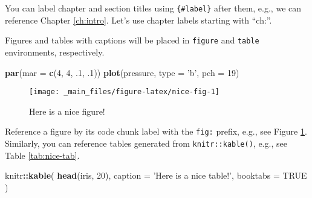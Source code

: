 \documentclass[]{book}
\newenvironment{Shaded}{\begin{snugshade}}{\end{snugshade}}
\newcommand{\DataTypeTok}[1]{\textcolor[rgb]{0.13,0.29,0.53}{#1}}
\newcommand{\DecValTok}[1]{\textcolor[rgb]{0.00,0.00,0.81}{#1}}
\newcommand{\FloatTok}[1]{\textcolor[rgb]{0.00,0.00,0.81}{#1}}
\newcommand{\KeywordTok}[1]{\textcolor[rgb]{0.13,0.29,0.53}{\textbf{#1}}}
\newcommand{\NormalTok}[1]{#1}
\newcommand{\OperatorTok}[1]{\textcolor[rgb]{0.81,0.36,0.00}{\textbf{#1}}}
\newcommand{\OtherTok}[1]{\textcolor[rgb]{0.56,0.35,0.01}{#1}}
\newcommand{\StringTok}[1]{\textcolor[rgb]{0.31,0.60,0.02}{#1}}
\begin{document}
You can label chapter and section titles using \texttt{\{\#label\}} after them, e.g., we can reference Chapter \ref{ch:intro}.
Let's use chapter labels starting with ``ch:''.

Figures and tables with captions will be placed in \texttt{figure} and \texttt{table} environments, respectively.

\begin{Shaded}
\begin{Highlighting}[]
\KeywordTok{par}\NormalTok{(}\DataTypeTok{mar =} \KeywordTok{c}\NormalTok{(}\DecValTok{4}\NormalTok{, }\DecValTok{4}\NormalTok{, }\FloatTok{.1}\NormalTok{, }\FloatTok{.1}\NormalTok{))}
\KeywordTok{plot}\NormalTok{(pressure, }\DataTypeTok{type =} \StringTok{'b'}\NormalTok{, }\DataTypeTok{pch =} \DecValTok{19}\NormalTok{)}
\end{Highlighting}
\end{Shaded}

\begin{figure}

{\centering \texttt{[image: \_main\_files/figure-latex/nice-fig-1]} 

}

\caption{Here is a nice figure!}\label{fig:nice-fig}
\end{figure}

Reference a figure by its code chunk label with the \texttt{fig:} prefix, e.g., see Figure \ref{fig:nice-fig}. Similarly, you can reference tables generated from \texttt{knitr::kable()}, e.g., see Table \ref{tab:nice-tab}.

\begin{Shaded}
\begin{Highlighting}[]
\NormalTok{knitr}\OperatorTok{::}\KeywordTok{kable}\NormalTok{(}
  \KeywordTok{head}\NormalTok{(iris, }\DecValTok{20}\NormalTok{), }\DataTypeTok{caption =} \StringTok{'Here is a nice table!'}\NormalTok{,}
  \DataTypeTok{booktabs =} \OtherTok{TRUE}
\NormalTok{)}
\end{Highlighting}
\end{Shaded}
\end{document}
